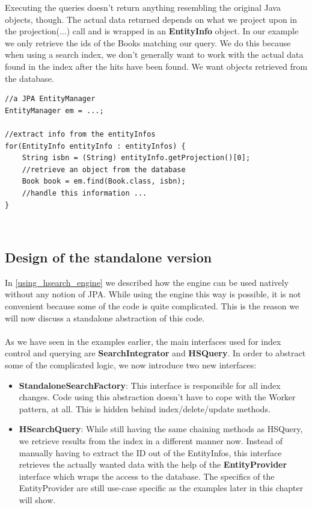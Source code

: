 \pagebreak
\noindent
Executing the queries doesn't return anything resembling the original Java objects, though. The actual data returned depends on what we project upon in the projection(...) call and is wrapped in an \textbf{EntityInfo} object. In our example we only retrieve the ids of the Books matching our query. We do this because when using a search index, we don't generally want to work with the actual data found in the index after the hits have been found. We want objects retrieved from the database.
\\
\lstset{language=java}
\begin{lstlisting}[frame=htrbl, caption={Extracting info from the results}, label={lst:querying_natively.java_2}]
//a JPA EntityManager
EntityManager em = ...;

//extract info from the entityInfos
for(EntityInfo entityInfo : entityInfos) {
	String isbn = (String) entityInfo.getProjection()[0];
	//retrieve an object from the database
	Book book = em.find(Book.class, isbn);
	//handle this information ...
}
\end{lstlisting}

\pagebreak
~
\pagebreak

\subsection{Design of the standalone version} \label{standalone_hibernate_search}

In \ref{using_hsearch_engine} we described how the engine can be used natively without any notion of JPA. While using the engine this way is possible, it is not convenient because some of the code is quite complicated. This is the reason we will now discuss a standalone abstraction of this code.
\\\\
As we have seen in the examples earlier, the main interfaces used for index control and querying are \textbf{SearchIntegrator} and \textbf{HSQuery}. In order to abstract some of the complicated logic, we now introduce two new interfaces: 

\begin{itemize}
	\item \textbf{StandaloneSearchFactory}: This interface is responsible for all index changes. Code using this abstraction doesn't have to cope with the Worker pattern, at all. This is hidden behind index/delete/update methods.
	
	\item \textbf{HSearchQuery}: While still having the same chaining methods as HSQuery, we retrieve results from the index in a different manner now. Instead of manually having to extract the ID out of the EntityInfos, this interface retrieves the actually wanted data with the help of the \textbf{EntityProvider} interface which wraps the access to the database. The specifics of the EntityProvider are still use-case specific as the examples later in this chapter will show.
\end{itemize}

